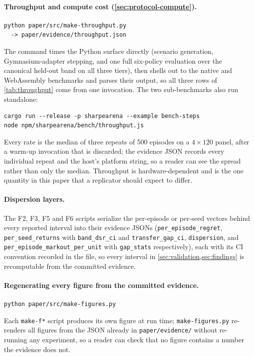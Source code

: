 \paragraph{Throughput and compute cost (\cref{sec:protocol-compute}).}
\begin{verbatim}
python paper/src/make-throughput.py
  -> paper/evidence/throughput.json
\end{verbatim}
The command times the Python surface directly (scenario generation, Gymnasium-adapter
stepping, and one full six-policy evaluation over the canonical held-out band on all
three tiers), then shells out to the native and WebAssembly benchmarks and parses their
output, so all three rows of \cref{tab:throughput} come from one invocation. The two
sub-benchmarks also run standalone:
\begin{verbatim}
cargo run --release -p sharpearena --example bench-steps
node npm/sharpearena/bench/throughput.js
\end{verbatim}
Every rate is the median of three repeats of 500 episodes on a $4\times120$ panel, after a
warm-up invocation that is discarded; the evidence JSON records every individual repeat
and the host's platform string, so a reader can see the spread rather than only the
median. Throughput is hardware-dependent and is the one quantity in this paper that a
replicator should expect to differ.

\paragraph{Dispersion layers.} The F2, F3, F5 and F6 scripts serialize the per-episode or per-seed vectors behind every reported interval into their evidence JSONs (\texttt{per\_episode\_regret}, \texttt{per\_seed\_returns} with \texttt{band\_dsr\_ci} and \texttt{transfer\_gap\_ci}, \texttt{dispersion}, and \texttt{per\_episode\_markout\_per\_unit} with \texttt{gap\_stats} respectively), each with its CI convention recorded in the file, so every interval in \cref{sec:validation,sec:findings} is recomputable from the committed evidence.

\paragraph{Regenerating every figure from the committed evidence.}
\begin{verbatim}
python paper/src/make-figures.py
\end{verbatim}
Each \texttt{make-f*} script produces its own figure at run time; \texttt{make-figures.py} re-renders all figures from the JSON already in \texttt{paper/evidence/} without re-running any experiment, so a reader can check that no figure contains a number the evidence does not.
